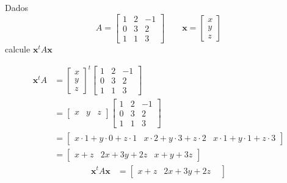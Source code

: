 \documentclass[a4paper,12pt,fleqn]{article}
\begin{document}

Dados
\[
  A =
  \begin{bmatrix}
    1 & 2 & -1 \\
    0 & 3 & 2  \\
    1 & 1 & 3
  \end{bmatrix}
\qquad
  \mathbf{x} =
  \begin{bmatrix}
    x \\ y \\ z
  \end{bmatrix}
\]
calcule \(\mathbf{x}^t A \mathbf{x}\)

\begin{answer}
  \begin{align*}
    \mathbf{x}^t A
    & =
    \begin{bmatrix}
      x \\ y \\ z
    \end{bmatrix}^t
    \begin{bmatrix}
      1 & 2 & -1 \\
      0 & 3 & 2  \\
      1 & 1 & 3
    \end{bmatrix}
    \\[2mm]
    & =
    \begin{bmatrix}
      x & y & z
    \end{bmatrix}
    \begin{bmatrix}
      1 & 2 & -1 \\
      0 & 3 & 2  \\
      1 & 1 & 3
    \end{bmatrix}
    \\[2mm]
    & =
    \begin{bmatrix}
      x \cdot 1 + y \cdot 0 + z \cdot 1 &
      x \cdot 2 + y \cdot 3 + z \cdot 2 &
      x \cdot 1 + y \cdot 1 + z \cdot 3
    \end{bmatrix}
    \\[2mm]
    & =
    \begin{bmatrix}
      x + z &
      2x + 3y + 2z &
      x + y + 3z
    \end{bmatrix}
  \end{align*}
  \begin{align*}
    \mathbf{x}^t A \mathbf{x}
    & =
    \begin{bmatrix}
      x + z &
      2x + 3y + 2z &

\end{bmatrix}
\end{align*}
\end{answer}
\end{document}
